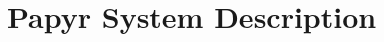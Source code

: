 \documentclass{sig-alternate}
\begin{document}




\section{Papyr System Description}
\label{sec:system-desc}
\end{document}
